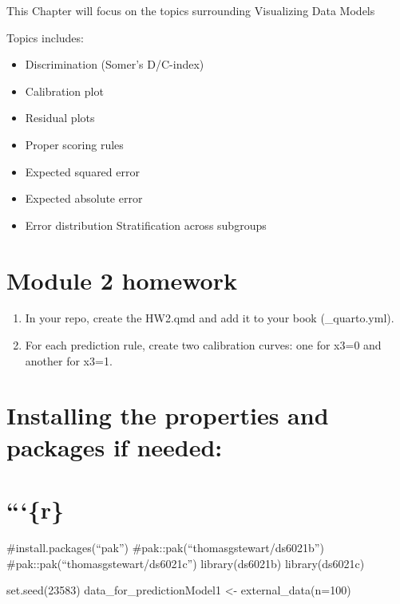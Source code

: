 \documentclass[
  letterpaper,
  DIV=11,
  numbers=noendperiod]{scrreprt}
\providecommand{\tightlist}{%
  \setlength{\itemsep}{0pt}\setlength{\parskip}{0pt}}
\begin{document}
This Chapter will focus on the topics surrounding Visualizing Data
Models

Topics includes:

\begin{itemize}
\tightlist
\item
  Discrimination (Somer's D/C-index)
\item
  Calibration plot
\item
  Residual plots
\item
  Proper scoring rules
\item
  Expected squared error
\item
  Expected absolute error
\item
  Error distribution Stratification across subgroups
\end{itemize}


\chapter{Module 2 homework}\label{module-2-homework}

\begin{enumerate}
\def\labelenumi{\arabic{enumi}.}
\tightlist
\item
  In your repo, create the HW2.qmd and add it to your book
  (\_quarto.yml).
\item
  For each prediction rule, create two calibration curves: one for x3=0
  and another for x3=1.
\end{enumerate}


\chapter{Installing the properties and packages if
needed:}\label{installing-the-properties-and-packages-if-needed}


\chapter{```\{r\}}\label{r-1}

\#install.packages(``pak'') \#pak::pak(``thomasgstewart/ds6021b'')
\#pak::pak(``thomasgstewart/ds6021c'') library(ds6021b) library(ds6021c)

set.seed(23583) data\_for\_predictionModel1 \textless-
external\_data(n=100)
\end{document}
